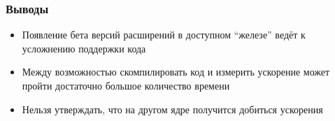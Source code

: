 \documentclass[
    aspectratio=169,
]{beamer}
\begin{document}
\begin{frame}
    \frametitle{Выводы}

    \begin{itemize}[<+->]
        \item Появление бета версий расширений в доступном \enquote{железе} ведёт к усложнению поддержки кода
        \item Между возможностью скомпилировать код и измерить ускорение может пройти достаточно большое количество времени
        \item Нельзя утверждать, что на другом ядре получится добиться ускорения
    \end{itemize}

    \ %

\end{frame}














\end{document}
